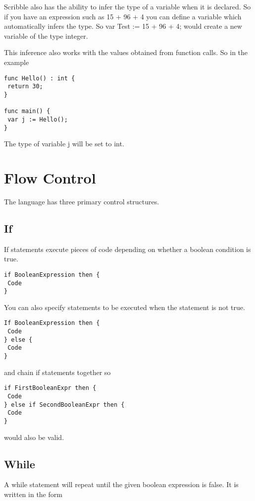\documentclass[]{final_report}
\begin{document}
Scribble also has the ability to infer the type of a variable when it is declared. So if you have an expression such as 15 + 96 + 4 you can define a variable which automatically infers the type. So var Test := 15 + 96 + 4; would create a new variable of the type integer.

This inference also works with the values obtained from function calls. So in the example

\begin{verbatim}
func Hello() : int {
 return 30;
}

func main() {
 var j := Hello();
}
\end{verbatim}

The type of variable j will be set to int.

\section{Flow Control}

The language has three primary control structures.

\subsection{If}

If statements execute pieces of code depending on whether a boolean condition is true.

\begin{verbatim}
if BooleanExpression then {
 Code
}
\end{verbatim}

You can also specify statements to be executed when the statement is not true.

\begin{verbatim}
If BooleanExpression then {
 Code
} else {
 Code 
}
\end{verbatim}

and chain if statements together so

\begin{verbatim}
if FirstBooleanExpr then {
 Code
} else if SecondBooleanExpr then {
 Code
}
\end{verbatim}

would also be valid.

\subsection{While}

A while statement will repeat until the given boolean expression is false. It is written in the form
\end{document}
